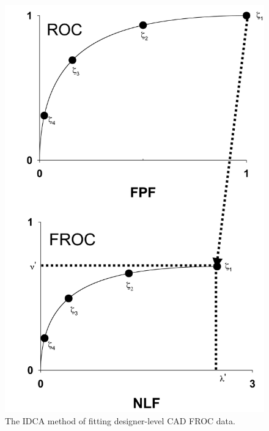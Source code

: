 \documentclass[
]{book}
\begin{document}
\begin{figure}

{\centering \includegraphics[width=1\linewidth,height=0.4\textheight]{images/rsm-fitting/idca-roc-froc-scaling} 

}

\caption{The IDCA method of fitting designer-level CAD FROC data.}\label{fig:rsm-fitting-fig2}
\end{figure}
\end{document}
